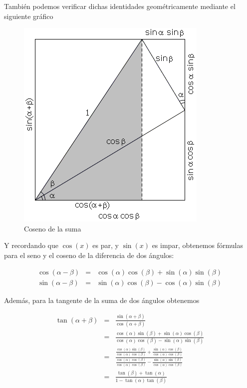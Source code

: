 También podemos verificar dichas identidades geométricamente mediante el siguiente gráfico 

\begin{figure}[h]
\centering\includegraphics[scale=0.7]{images/01_precalculo/cos_of_sum.png}
\caption{Coseno de la suma}
\end{figure}

Y recordando que $\cos(x)$ es par, y $\sin(x)$ es impar, obtenemos fórmulas para el seno y el coseno de la diferencia de dos ángulos:

 

\begin{eqnarray*}
\cos(\alpha - \beta) &=& \cos(\alpha)\cos(\beta) + \sin(\alpha)\sin(\beta) \\
\sin(\alpha - \beta) &=& \sin(\alpha)\cos(\beta) -\cos(\alpha)\sin(\beta)
\end{eqnarray*}

Además, para la tangente de la suma de dos ángulos obtenemos


\begin{eqnarray*}
\tan(\alpha + \beta) &=& \frac{\sin(\alpha + \beta)}{\cos(\alpha + \beta)} \\
 &=& \frac{\cos(\alpha)\sin(\beta) + \sin(\alpha)\cos(\beta)}{\cos(\alpha)\cos(\beta) - \sin(\alpha)\sin(\beta)} \\
 &=& \frac{\frac{\cos(\alpha)\sin(\beta)}{\cos(\alpha)\cos(\beta)} + \frac{\sin(\alpha)\cos(\beta)}{\cos(\alpha)\cos(\beta)}}{\frac{\cos(\alpha)\cos(\beta)}{\cos(\alpha)\cos(\beta)} - \frac{\sin(\alpha)\sin(\beta)}{\cos(\alpha)\cos(\beta)}} \\
 &=& \frac{\tan(\beta) + \tan(\alpha)}{1 - \tan(\alpha)\tan(\beta)}
\end{eqnarray*}

